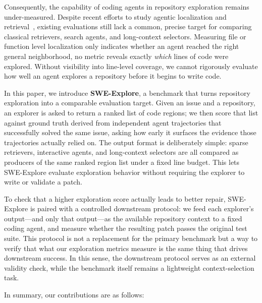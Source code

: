 Consequently, the capability of coding agents in repository exploration remains under-measured.
Despite recent efforts to study agentic localization and retrieval~\citep{li2026contextbench,zhang2025mulocbench,wang2026swepruner,zhu2026swecontextbench,chen2025locagent,yu2025orcaloca,suri2026codescout}, existing evaluations still lack a common, precise target for comparing classical retrievers, search agents, and long-context selectors. Measuring file or function level localization only indicates whether an agent reached the right general neighborhood, no metric reveals exactly \textit{which} lines of code were explored. Without visibility into line-level coverage, we cannot rigorously evaluate how well an agent explores a repository before it begins to write code.






In this paper, we introduce \textbf{SWE-Explore}, a benchmark that turns repository exploration into a comparable evaluation target. Given an issue and a repository, an explorer is asked to return a ranked list of code regions; we then score that list against ground truth derived from independent agent trajectories that successfully solved the same issue, asking how early it surfaces the evidence those trajectories actually relied on. The output format is deliberately simple: sparse retrievers, interactive agents, and long-context selectors are all compared as producers of the same ranked region list under a fixed line budget. This lets SWE-Explore evaluate exploration behavior without requiring the explorer to write or validate a patch.

To check that a higher exploration score actually leads to better repair, SWE-Explore is paired with a controlled downstream protocol: we feed each explorer's output---and only that output---as the available repository context to a fixed coding agent, and measure whether the resulting patch passes the original test suite. This protocol is not a replacement for the primary benchmark but a way to verify that what our exploration metrics measure is the same thing that drives downstream success. In this sense, the downstream protocol serves as an external validity check, while the benchmark itself remains a lightweight context-selection task.



In summary, our contributions are as follows:


